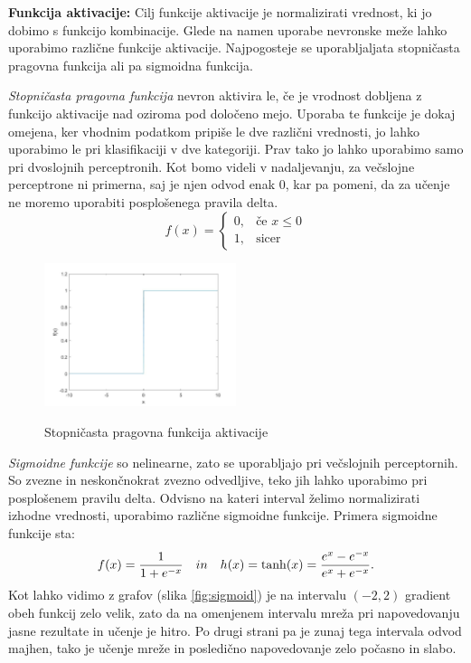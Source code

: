 \documentclass[mat1]{fmfdelo}
\begin{document}
\textbf{Funkcija aktivacije:}
Cilj funkcije aktivacije je normalizirati vrednost, ki jo dobimo s funkcijo kombinacije. Glede na namen uporabe nevronske meže lahko uporabimo različne funkcije aktivacije. Najpogosteje se uporabljaljata stopničasta pragovna funkcija ali pa sigmoidna funkcija.
%

\emph{Stopničasta pragovna funkcija} nevron aktivira le, če je vrodnost dobljena z funkcijo aktivacije nad oziroma pod določeno mejo. Uporaba te funkcije je dokaj omejena, ker vhodnim podatkom pripiše le dve različni vrednosti, jo lahko uporabimo le pri klasifikaciji v dve kategoriji. Prav tako jo lahko uporabimo samo pri dvoslojnih perceptronih. Kot bomo videli v nadaljevanju, za večslojne perceptrone ni primerna, saj je njen odvod enak $0$, kar pa pomeni, da za učenje ne moremo uporabiti posplošenega pravila delta.
%
\begin{equation*}
f(x)=
    \begin{cases}
      0, & \text{če } x  \leq 0 \\
      1, & \text{sicer}
    \end{cases} 
\end{equation*}
%
\begin{figure}[!ht]
  \centering
    \includegraphics[width=0.5\textwidth]{step_fun.jpg}
  \label{fig:step}
 \caption{Stopničasta pragovna funkcija aktivacije}
\end{figure}
%

\emph{Sigmoidne funkcije} so nelinearne, zato se uporabljajo pri večslojnih perceptornih. So zvezne in neskončnokrat zvezno odvedljive, teko jih lahko uporabimo pri posplošenem pravilu delta. Odvisno na kateri interval želimo normalizirati izhodne vrednosti, uporabimo različne sigmoidne funkcije. Primera sigmoidne funkcije sta: 
%
\begin{equation}
f(x) = \frac{1}{1+e^{-x}} \quad in \quad h(x) = \tanh(x) = \frac{e^x-e^{-x}}{e^x+e^{-x}} \text.
\end{equation}
%
Kot lahko vidimo z grafov (slika \ref{fig:sigmoid}) je na intervalu $(-2,2)$ gradient obeh funkcij zelo velik, zato da na omenjenem intervalu mreža pri napovedovanju jasne rezultate in učenje je hitro. Po drugi strani pa je zunaj tega intervala odvod majhen, tako je učenje mreže in posledično napovedovanje zelo počasno in slabo.
\end{document}
